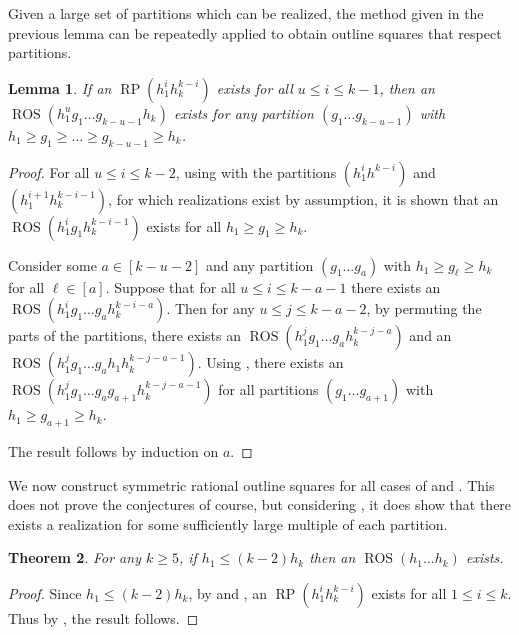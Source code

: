 \documentclass[preprint,nonatbib]{elsarticle}
\DeclareMathOperator{\LS}{RP}
\DeclareMathOperator{\ROS}{ROS}
\newtheorem{theorem}{Theorem}[section]
\newtheorem{lemma}[theorem]{Lemma}
\theoremstyle{definition}
\numberwithin{equation}{section}
\begin{document}
Given a large set of partitions which can be realized, the method given in the previous lemma can be repeatedly applied to obtain outline squares that respect partitions.

\begin{lemma}
\label{lemma: All comb between range}
    If an $\LS(h_1^ih_k^{k-i})$ exists for all $u\leq i\leq k-1$, then an $\ROS(h_1^u g_1\dots g_{k-u-1} h_k)$ exists for any partition $(g_1\dots g_{k-u-1})$ with $h_1\geq g_1\geq\dots\geq g_{k-u-1}\geq h_k$.
\end{lemma}
\begin{proof}
    For all $u\leq i\leq k-2$, using  with the partitions $(h_1^{i}h^{k-i})$ and $(h_1^{i+1}h_k^{k-i-1})$, for which realizations exist by assumption, it is shown that an $\ROS(h_1^ig_1h_k^{k-i-1})$ exists for all $h_1\geq g_1\geq h_k$.

    Consider some $a\in[k-u-2]$ and any partition $(g_1\dots g_a)$ with $h_1\geq g_\ell\geq h_k$ for all $\ell\in [a]$. Suppose that for all $u\leq i\leq k-a-1$ there exists an $\ROS(h_1^i g_1\dots g_a h_k^{k-i-a})$. Then for any $u\leq j\leq k-a-2$, by permuting the parts of the partitions, there exists an $\ROS(h_1^j g_1\dots g_a h_k^{k-j-a})$ and an $\ROS(h_1^j g_1\dots g_a h_1 h_k^{k-j-a-1})$. Using , there exists an $\ROS(h_1^j g_1\dots g_a g_{a+1} h_k^{k-j-a-1})$ for all partitions $(g_1\dots g_{a+1})$ with $h_1\geq g_{a+1}\geq h_k$.

    The result follows by induction on $a$.
\end{proof}

We now construct symmetric rational outline squares for all cases of  and . This does not prove the conjectures of course, but considering , it does show that there exists a realization for some sufficiently large multiple of each partition.

\begin{theorem}
    For any $k\geq 5$, if $h_1\leq (k-2)h_k$ then an $\ROS(h_1\dots h_k)$ exists.
\end{theorem}
\begin{proof}
    Since $h_1\leq (k-2)h_k$, by  and , an $\LS(h_1^ih_k^{k-i})$ exists for all $1\leq i\leq k$. Thus by , the result follows.
\end{proof}
\end{document}
